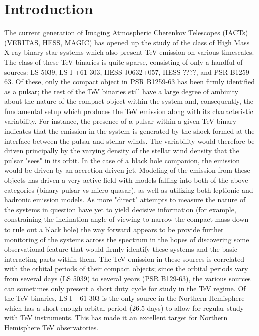 \documentclass[preprint2]{aastex}
\begin{document}
\keywords{}

\section{Introduction}

The current generation of Imaging Atmospheric Cherenkov Telescopes (IACTs) (VERITAS, HESS, MAGIC) has opened up the study of the class of High Mass X-ray binary star systems which also present TeV emission on various timescales. The class of these TeV binaries is quite sparse, consisting of only a handful of sources: LS 5039, LS I +61 303, HESS J0632+057, HESS ????, and PSR B1259-63. Of these, only the compact object in PSR B1259-63 has been firmly identified as a pulsar; the rest of the TeV binaries still have a large degree of ambiuity about the nature of the compact object within the system and, consequently, the fundamental setup which produces the TeV emission along with its characteristic variability. For instance, the presence of a pulsar within a given TeV binary indicates that the emission in the system is generated by the shock formed at the interface between the pulsar and stellar winds. The variability would therefore be driven principally by the varying density of the stellar wind density that the pulsar "sees" in its orbit. In the case of a black hole companion, the emission would be driven by an accretion driven jet. Modeling of the emission from these objects has driven a very active field with models falling into both of the above categories (binary pulsar vs micro quasar), as well as utilizing both leptionic and hadronic emission models. As more "direct" attempts to measure the nature of the systems in question have yet to yield decisive information (for example, constraining the inclination angle of viewing to narrow the compact mass down to rule out a black hole) the way forward appears to be provide further monitoring of the systems across the spectrum in the hopes of discovering some observational feature that would firmly identify these systems and the basic interacting parts within them. The TeV emission in these sources is correlated with the orbital periods of their compact objects; since the orbital periods vary from several days (LS 5039) to several years (PSR B129-63), the various sources can sometimes only present a short duty cycle for study in the TeV regime. Of the TeV binaries, LS I +61 303 is the only source in the Northern Hemisphere which has a short enough orbital period (26.5 days) to allow for regular study with TeV instruments. This has made it an excellent target for Northern Hemisphere TeV observatories. 
\end{document}
